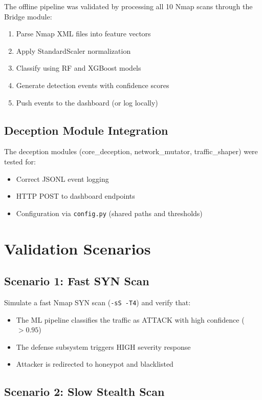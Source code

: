 The offline pipeline was validated by processing all 10 Nmap scans through the Bridge module:

\begin{enumerate}
    \item Parse Nmap XML files into feature vectors
    \item Apply StandardScaler normalization
    \item Classify using RF and XGBoost models
    \item Generate detection events with confidence scores
    \item Push events to the dashboard (or log locally)
\end{enumerate}

\subsection{Deception Module Integration}

The deception modules (core\_deception, network\_mutator, traffic\_shaper) were tested for:
\begin{itemize}
    \item Correct JSONL event logging
    \item HTTP POST to dashboard endpoints
    \item Configuration via \texttt{config.py} (shared paths and thresholds)
\end{itemize}

\section{Validation Scenarios}

\subsection{Scenario 1: Fast SYN Scan}

Simulate a fast Nmap SYN scan (\texttt{-sS -T4}) and verify that:
\begin{itemize}
    \item The ML pipeline classifies the traffic as ATTACK with high confidence ($> 0.95$)
    \item The defense subsystem triggers HIGH severity response
    \item Attacker is redirected to honeypot and blacklisted
\end{itemize}

\subsection{Scenario 2: Slow Stealth Scan}

